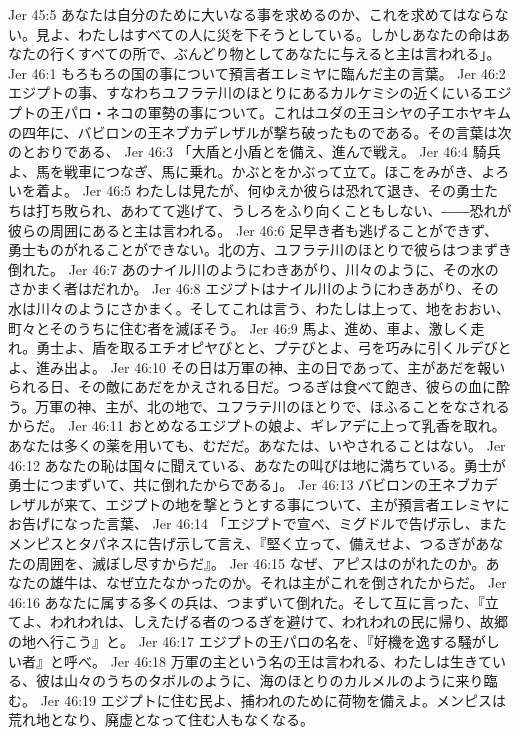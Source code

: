 Jer 45:5  あなたは自分のために大いなる事を求めるのか、これを求めてはならない。見よ、わたしはすべての人に災を下そうとしている。しかしあなたの命はあなたの行くすべての所で、ぶんどり物としてあなたに与えると主は言われる」。
Jer 46:1  もろもろの国の事について預言者エレミヤに臨んだ主の言葉。
Jer 46:2  エジプトの事、すなわちユフラテ川のほとりにあるカルケミシの近くにいるエジプトの王パロ・ネコの軍勢の事について。これはユダの王ヨシヤの子エホヤキムの四年に、バビロンの王ネブカデレザルが撃ち破ったものである。その言葉は次のとおりである、
Jer 46:3  「大盾と小盾とを備え、進んで戦え。
Jer 46:4  騎兵よ、馬を戦車につなぎ、馬に乗れ。かぶとをかぶって立て。ほこをみがき、よろいを着よ。
Jer 46:5  わたしは見たが、何ゆえか彼らは恐れて退き、その勇士たちは打ち敗られ、あわてて逃げて、うしろをふり向くこともしない、――恐れが彼らの周囲にあると主は言われる。
Jer 46:6  足早き者も逃げることができず、勇士ものがれることができない。北の方、ユフラテ川のほとりで彼らはつまずき倒れた。
Jer 46:7  あのナイル川のようにわきあがり、川々のように、その水のさかまく者はだれか。
Jer 46:8  エジプトはナイル川のようにわきあがり、その水は川々のようにさかまく。そしてこれは言う、わたしは上って、地をおおい、町々とそのうちに住む者を滅ぼそう。
Jer 46:9  馬よ、進め、車よ、激しく走れ。勇士よ、盾を取るエチオピヤびとと、プテびとよ、弓を巧みに引くルデびとよ、進み出よ。
Jer 46:10  その日は万軍の神、主の日であって、主があだを報いられる日、その敵にあだをかえされる日だ。つるぎは食べて飽き、彼らの血に酔う。万軍の神、主が、北の地で、ユフラテ川のほとりで、ほふることをなされるからだ。
Jer 46:11  おとめなるエジプトの娘よ、ギレアデに上って乳香を取れ。あなたは多くの薬を用いても、むだだ。あなたは、いやされることはない。
Jer 46:12  あなたの恥は国々に聞えている、あなたの叫びは地に満ちている。勇士が勇士につまずいて、共に倒れたからである」。
Jer 46:13  バビロンの王ネブカデレザルが来て、エジプトの地を撃とうとする事について、主が預言者エレミヤにお告げになった言葉、
Jer 46:14  「エジプトで宣べ、ミグドルで告げ示し、またメンピスとタパネスに告げ示して言え、『堅く立って、備えせよ、つるぎがあなたの周囲を、滅ぼし尽すからだ』。
Jer 46:15  なぜ、アピスはのがれたのか。あなたの雄牛は、なぜ立たなかったのか。それは主がこれを倒されたからだ。
Jer 46:16  あなたに属する多くの兵は、つまずいて倒れた。そして互に言った、『立てよ、われわれは、しえたげる者のつるぎを避けて、われわれの民に帰り、故郷の地へ行こう』と。
Jer 46:17  エジプトの王パロの名を、『好機を逸する騒がしい者』と呼べ。
Jer 46:18  万軍の主という名の王は言われる、わたしは生きている、彼は山々のうちのタボルのように、海のほとりのカルメルのように来り臨む。
Jer 46:19  エジプトに住む民よ、捕われのために荷物を備えよ。メンピスは荒れ地となり、廃虚となって住む人もなくなる。
